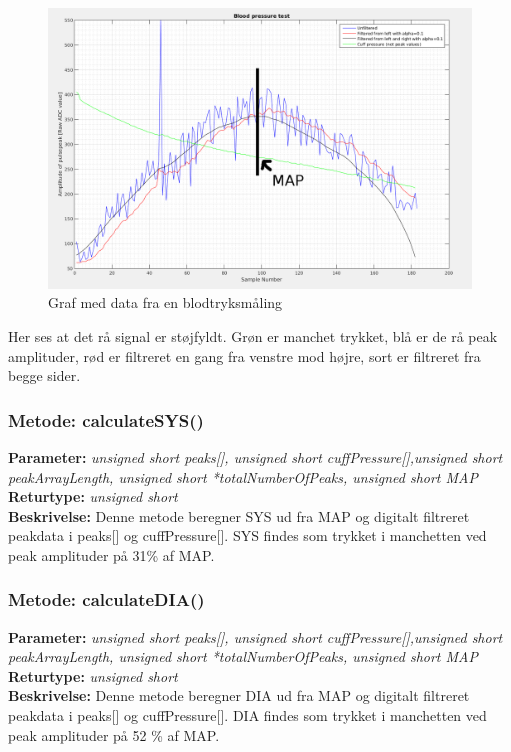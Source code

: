 \newpage
\begin{figure}[H]
	\includegraphics[width=\textwidth]{billeder/4_11_2016.png}
	\caption{Graf med data fra en blodtryksmåling}\label{fig:bpMeasurement}
\end{figure}
Her ses at det rå signal er støjfyldt. Grøn er manchet trykket, blå er de rå peak amplituder, rød er filtreret en gang fra venstre mod højre, sort	er filtreret fra begge sider.

\subsubsection{Metode: calculateSYS()}
\textbf{Parameter: } \textit{unsigned short peaks[], unsigned short cuffPressure[],unsigned short peakArrayLength, unsigned short *totalNumberOfPeaks, unsigned short MAP}
\\ \textbf{Returtype: } \textit{unsigned short}
\\ \textbf{Beskrivelse: } Denne metode beregner SYS ud fra MAP og digitalt filtreret peakdata i peaks[] og cuffPressure[]. SYS findes som trykket i manchetten ved peak amplituder på 31\% af MAP.

\subsubsection{Metode: calculateDIA()}
\textbf{Parameter: } \textit{unsigned short peaks[], unsigned short cuffPressure[],unsigned short peakArrayLength, unsigned short *totalNumberOfPeaks, unsigned short MAP}
\\ \textbf{Returtype: } \textit{unsigned short}
\\ \textbf{Beskrivelse: } Denne metode beregner DIA ud fra MAP og digitalt filtreret peakdata i peaks[] og cuffPressure[]. DIA findes som trykket i manchetten ved peak amplituder på 52 \% af MAP. 

